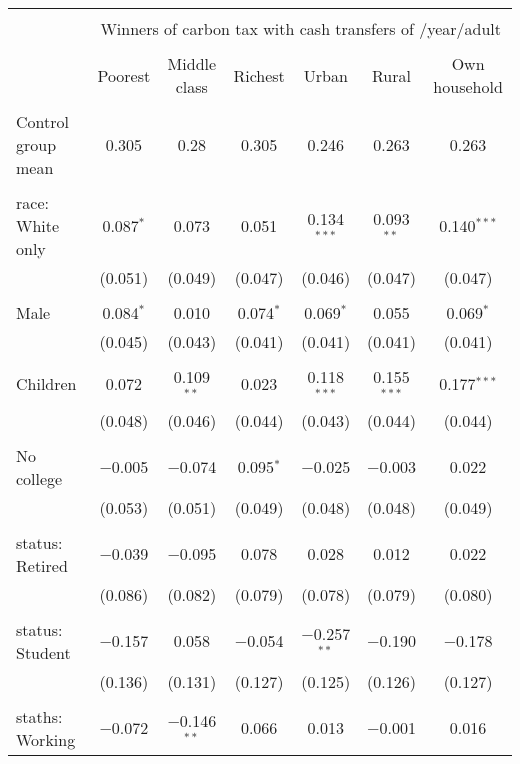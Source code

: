 
\begin{tabular}{@{\extracolsep{5pt}}lcccccc} 
\\[-1.8ex]\hline 
\hline \\[-1.8ex] 
 & \multicolumn{6}{c}{Winners of carbon tax with cash transfers of \textdollar 600/year/adult} \\ 
\cline{2-7} 
\\[-1.8ex] & Poorest & Middle class & Richest & Urban & Rural & Own household \\ 
\hline \\[-1.8ex] 
 Control group mean & 0.305 & 0.28 & 0.305 & 0.246 & 0.263 & 0.263  \\ \hline \\[-1.8ex] race: White only & 0.087$^{*}$ & 0.073 & 0.051 & 0.134$^{***}$ & 0.093$^{**}$ & 0.140$^{***}$ \\ 
  & (0.051) & (0.049) & (0.047) & (0.046) & (0.047) & (0.047) \\ 
  & & & & & & \\ 
 Male & 0.084$^{*}$ & 0.010 & 0.074$^{*}$ & 0.069$^{*}$ & 0.055 & 0.069$^{*}$ \\ 
  & (0.045) & (0.043) & (0.041) & (0.041) & (0.041) & (0.041) \\ 
  & & & & & & \\ 
 Children & 0.072 & 0.109$^{**}$ & 0.023 & 0.118$^{***}$ & 0.155$^{***}$ & 0.177$^{***}$ \\ 
  & (0.048) & (0.046) & (0.044) & (0.043) & (0.044) & (0.044) \\ 
  & & & & & & \\ 
 No college & $-$0.005 & $-$0.074 & 0.095$^{*}$ & $-$0.025 & $-$0.003 & 0.022 \\ 
  & (0.053) & (0.051) & (0.049) & (0.048) & (0.048) & (0.049) \\ 
  & & & & & & \\ 
 status: Retired & $-$0.039 & $-$0.095 & 0.078 & 0.028 & 0.012 & 0.022 \\ 
  & (0.086) & (0.082) & (0.079) & (0.078) & (0.079) & (0.080) \\ 
  & & & & & & \\ 
 status: Student & $-$0.157 & 0.058 & $-$0.054 & $-$0.257$^{**}$ & $-$0.190 & $-$0.178 \\ 
  & (0.136) & (0.131) & (0.127) & (0.125) & (0.126) & (0.127) \\ 
  & & & & & & \\ 
 staths: Working & $-$0.072 & $-$0.146$^{**}$ & 0.066 & 0.013 & $-$0.001 & 0.016 \\ 

\end{tabular}
